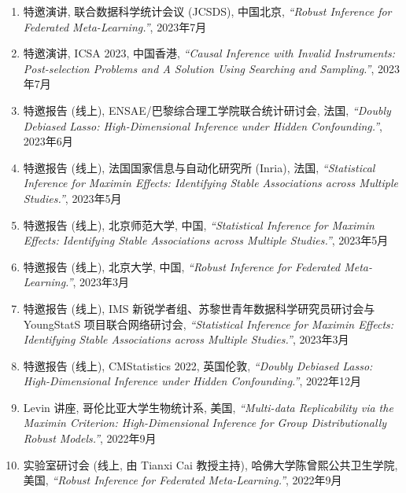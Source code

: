\documentclass[margin, line]{res}
\begin{document}
\begin{resume}
\begin{enumerate}
            \item 特邀演讲, 联合数据科学统计会议 (JCSDS), 中国北京, {\it ``Robust Inference for Federated Meta-Learning.''}, 
                2023年7月

            \item 特邀演讲, ICSA 2023, 中国香港, {\it ``Causal Inference with Invalid Instruments: Post-selection Problems and A Solution Using Searching and Sampling.''}, 
                2023年7月

            \item 特邀报告 (线上), ENSAE/巴黎综合理工学院联合统计研讨会, 法国, 
                {\it ``Doubly Debiased Lasso: High-Dimensional Inference under Hidden Confounding.''}, 
                2023年6月

            \item 特邀报告 (线上), 法国国家信息与自动化研究所 (Inria), 法国, 
                {\it ``Statistical Inference for Maximin Effects: Identifying Stable Associations across Multiple Studies.''}, 
                2023年5月

            \item 特邀报告 (线上), 北京师范大学, 中国, 
                {\it ``Statistical Inference for Maximin Effects: Identifying Stable Associations across Multiple Studies.''}, 
                2023年5月

            \item 特邀报告 (线上), 北京大学, 中国, 
                {\it ``Robust Inference for Federated Meta-Learning.''}, 2023年3月

            \item 特邀报告 (线上), IMS 新锐学者组、苏黎世青年数据科学研究员研讨会与 YoungStatS 项目联合网络研讨会, 
                {\it ``Statistical Inference for Maximin Effects: Identifying Stable Associations across Multiple Studies.''}, 
                2023年3月

			\item 特邀报告 (线上), CMStatistics 2022, 英国伦敦, {\it ``Doubly Debiased Lasso: High-Dimensional Inference under Hidden Confounding.''}, 
                2022年12月

            \item Levin 讲座, 哥伦比亚大学生物统计系, 美国, 
                {\it ``Multi-data Replicability via the Maximin Criterion: High-Dimensional Inference for Group Distributionally Robust Models.''}, 
                2022年9月

            \item 实验室研讨会 (线上, 由 Tianxi Cai 教授主持), 哈佛大学陈曾熙公共卫生学院, 美国, {\it ``Robust Inference for Federated Meta-Learning.''}, 
                2022年9月


\end{enumerate}
\end{resume}
\end{document}
